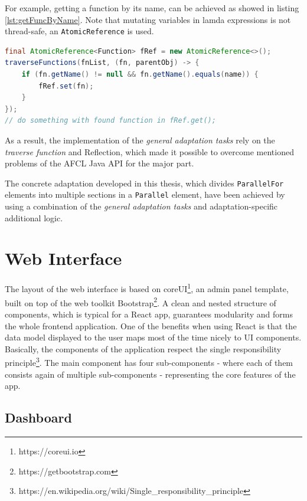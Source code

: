 \documentclass[a4paper,12pt,pdftex,halfparskip,cleardoubleempty,bibtotoc,liststotoc]{scrbook}
\begin{document}
For example, getting a function by its name, can be achieved as showed in listing \ref{lst:getFuncByName}. \small Note that mutating variables in lamda expressions is not thread-safe, an \texttt{AtomicReference} is used.

\begin{lstlisting}[language=Java,caption={get a function by its name},label=lst:getFuncByName]
final AtomicReference<Function> fRef = new AtomicReference<>();
traverseFunctions(fnList, (fn, parentObj) -> {
    if (fn.getName() != null && fn.getName().equals(name)) {
        fRef.set(fn);
    }
});
// do something with found function in fRef.get();
\end{lstlisting}

As a result, the implementation of the \textit{general adaptation tasks} rely on the \textit{traverse function} and Reflection, which made it possible to overcome mentioned problems of the AFCL Java API for the major part.

The concrete adaptation developed in this thesis, which divides \texttt{ParallelFor} elements into multiple sections in a \texttt{Parallel} element, have been achieved by using a combination of the \textit{general adaptation tasks} and adaptation-specific additional logic.


\chapter{Web Interface}
\label{chap:impl-webinterface}

The layout of the web interface is based on coreUI\footnote{https://coreui.io}, an admin panel template, built on top of the web toolkit Bootstrap\footnote{https://getbootstrap.com}. A clean and nested structure of components, which is typical for a React app, guarantees modularity and forms the whole frontend application. One of the benefits when using React is that the data model displayed to the user maps most of the time nicely to UI components. Basically, the components of the application respect the single responsibility principle\footnote{https://en.wikipedia.org/wiki/Single\_responsibility\_principle}. The main component has four sub-components - where each of them consists again of multiple sub-components - representing the core features of the app.

\section{Dashboard}
\end{document}
